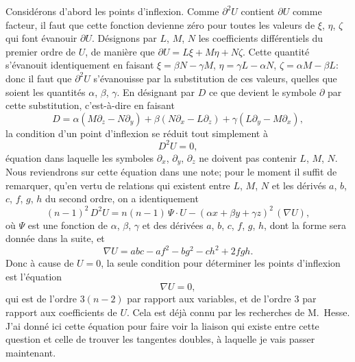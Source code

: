\documentclass[11pt]{article}
\begin{document}
\medskip
Consid\'erons d'abord les points d'inflexion. Comme $\partial^{2} U$ contient $\partial U$ comme facteur,
il faut que cette fonction devienne z\'ero pour toutes les valeurs de $\xi$, $\eta$, $\zeta$ qui font
\'evanouir $\partial U$. D\'esignons par $L$, $M$, $N$ les coefficients diff\'erentiels du premier ordre de
$U$, de mani\`ere que $\partial U = L \xi + M \eta + N \zeta$. Cette quantit\'e s'\'evanouit identiquement en
faisant $\xi = \beta N - \gamma M$, $\eta = \gamma L - \alpha N$, $\zeta = \alpha M - \beta L$: donc il faut que $\partial^{2} U$ s'\'evanouisse par
la substitution de ces valeurs, quelles que soient les quantit\'es $\alpha$, $\beta$, $\gamma$. En d\'esignant
par $D$ ce que devient le symbole $\partial$ par cette substitution, c'est-\`a-dire en faisant
\[
D = \alpha(M \partial_{z} - N \partial_{y}) + \beta(N \partial_{x} - L \partial_{z}) + \gamma(L \partial_{y} - M \partial_{x}),
\]
la condition d'un point d'inflexion se r\'eduit tout simplement \`a
\[
D^{2} U = 0,
\]
\'equation dans laquelle les symboles $\partial_{x}$, $\partial_{y}$, $\partial_{z}$ ne doivent pas contenir $L$, $M$, $N$. Nous
reviendrons sur cette \'equation dans une note; pour le moment il suffit de remarquer,
qu'en vertu de relations qui existent entre $L$, $M$, $N$ et les d\'eriv\'es $a$, $b$, $c$, $f$, $g$, $h$ du
second ordre, on a identiquement
\[
(n - 1)^{2}\,D^{2} U = n(n - 1)\,\Psi \cdot U - (\alpha x + \beta y + \gamma z)^{2}\,(\nabla U),
\]
o\`u $\Psi$ est une fonction de $\alpha$, $\beta$, $\gamma$ et des d\'eriv\'ees $a$, $b$, $c$, $f$, $g$, $h$, dont la forme sera
donn\'ee dans la suite, et
\[
\nabla U = a b c - a f^{2} - b g^{2} - c h^{2} + 2 f g h.
\]
Donc \`a cause de $U = 0$, la seule condition pour d\'eterminer les points d'inflexion est
l'\'equation
\[
\nabla U = 0,
\]
qui est de l'ordre $3(n - 2)$ par rapport aux variables, et de l'ordre $3$ par rapport aux
coefficients de $U$. Cela est d\'ej\`a connu par les recherches de M.~Hesse. J'ai donn\'e
ici cette \'equation pour faire voir la liaison qui existe entre cette question et celle de
trouver les tangentes doubles, \`a laquelle je vais passer maintenant.
\end{document}
